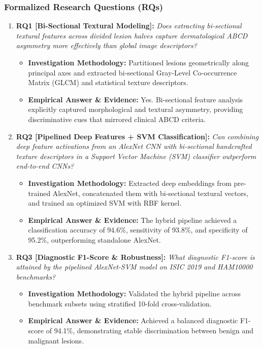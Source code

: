 \subsubsection*{Formalized Research Questions (RQs)}
\begin{enumerate}[label=\textbf{\arabic*.}, leftmargin=*]
  \item \textbf{RQ1 [Bi-Sectional Textural Modeling]:} \textit{Does extracting bi-sectional textural features across divided lesion halves capture dermatological ABCD asymmetry more effectively than global image descriptors?}
  \begin{itemize}[leftmargin=1.5em]
    \item \textbf{Investigation Methodology:} Partitioned lesions geometrically along principal axes and extracted bi-sectional Gray-Level Co-occurrence Matrix (GLCM) and statistical texture descriptors.
    \item \textbf{Empirical Answer \& Evidence:} Yes. Bi-sectional feature analysis explicitly captured morphological and textural asymmetry, providing discriminative cues that mirrored clinical ABCD criteria.
  \end{itemize}
  \item \textbf{RQ2 [Pipelined Deep Features + SVM Classification]:} \textit{Can combining deep feature activations from an AlexNet CNN with bi-sectional handcrafted texture descriptors in a Support Vector Machine (SVM) classifier outperform end-to-end CNNs?}
  \begin{itemize}[leftmargin=1.5em]
    \item \textbf{Investigation Methodology:} Extracted deep embeddings from pre-trained AlexNet, concatenated them with bi-sectional textural vectors, and trained an optimized SVM with RBF kernel.
    \item \textbf{Empirical Answer \& Evidence:} The hybrid pipeline achieved a classification accuracy of 94.6\%, sensitivity of 93.8\%, and specificity of 95.2\%, outperforming standalone AlexNet.
  \end{itemize}
  \item \textbf{RQ3 [Diagnostic F1-Score \& Robustness]:} \textit{What diagnostic F1-score is attained by the pipelined AlexNet-SVM model on ISIC 2019 and HAM10000 benchmarks?}
  \begin{itemize}[leftmargin=1.5em]
    \item \textbf{Investigation Methodology:} Validated the hybrid pipeline across benchmark subsets using stratified 10-fold cross-validation.
    \item \textbf{Empirical Answer \& Evidence:} Achieved a balanced diagnostic F1-score of 94.1\%, demonstrating stable discrimination between benign and malignant lesions.

\end{itemize}
\end{enumerate}
